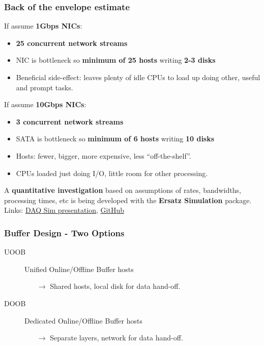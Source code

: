 \documentclass[xcolor=dvipsnames]{beamer}
\begin{document}
\begin{frame}
  \frametitle{Back of the envelope estimate}
  
  If assume \textbf{1Gbps NICs}:
  \begin{itemize}
  \item \textbf{25 concurrent network streams}
  \item NIC is bottleneck so \textbf{minimum of 25 hosts} writing \textbf{2-3 disks}
  \item Beneficial side-effect: leaves plenty of idle CPUs to load up doing other, useful and prompt tasks.
  \end{itemize}

  If assume \textbf{10Gbps NICs}:
  \begin{itemize}
  \item \textbf{3 concurrent network streams}
  \item SATA is bottleneck so \textbf{minimum of 6 hosts} writing \textbf{10 disks}
  \item Hosts: fewer, bigger, more expensive, less ``off-the-shelf''.
  \item CPUs loaded just doing I/O, little room for other processing.
  \end{itemize}
  \vspace{5mm}

  A \textbf{quantitative investigation} based on assumptions of rates,
  bandwidths, processing times, etc is being developed with the
  \textbf{Ersatz Simulation} package. Links:
  \href{https://indico.fnal.gov/conferenceDisplay.py?confId=12498}{DAQ
    Sim presentation},
  \href{https://github.com/brettviren/ersatz}{GitHub}

\end{frame}

\begin{frame}
  \frametitle{Buffer Design - Two Options}
  
  \begin{description}
  \item[UOOB] Unified Online/Offline Buffer hosts
    \begin{itemize}
    \item[$\rightarrow$] Shared hosts, local disk for data hand-off.
    \end{itemize}
  \item[DOOB] Dedicated Online/Offline Buffer hosts
    \begin{itemize}
    \item[$\rightarrow$] Separate layers, network for data hand-off.
    \end{itemize}
  \end{description}

\end{frame}
\end{document}
